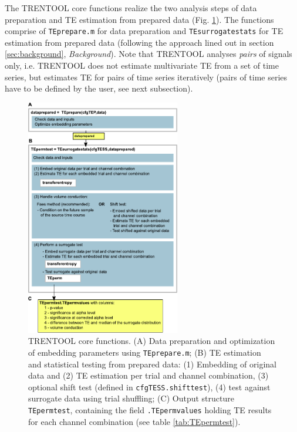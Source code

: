 \documentclass[a4paper,10pt]{article}
\begin{document}
The TRENTOOL core functions realize the two analysis steps of data preparation and TE estimation from prepared data (Fig. \ref{fig:core_functions}). The functions comprise of \verb&TEprepare.m& for data preparation and \verb&TEsurrogatestats& for TE estimation from prepared data (following the approach lined out in section \ref{sec:background}, \textit{Background}). Note that TRENTOOL analyses \textit{pairs} of signals only, i.e. TRENTOOL does not estimate multivariate TE from a set of time series, but estimates TE for pairs of time series iteratively (pairs of time series have to be defined by the user, see next subsection).


\begin{figure}[H]	
	\centering 
 		\includegraphics[width=0.60\textwidth]{figures/TRENTOOL3_workflow_CPU.pdf}
	\caption[TRENTOOL core functions]{TRENTOOL core functions. (A) Data preparation and optimization of embedding parameters using \texttt{TEprepare.m}; (B) TE estimation and statistical testing from prepared data: (1) Embedding of original data and (2) TE estimation per trial and channel combination, (3) optional shift test (defined in \texttt{cfgTESS.shifttest}), (4) test against surrogate data using trial shuffling; (C) Output structure \texttt{TEpermtest}, containing the field \texttt{.TEpermvalues} holding TE results for each channel combination (see table \ref{tab:TEpermtest}).}
	\label{fig:core_functions}
\end{figure}
\end{document}
